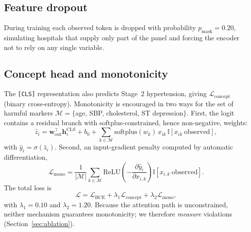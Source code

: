 \documentclass[journal]{IEEEtran}
\begin{document}
\subsection{Feature dropout}
During training each observed token is dropped with probability $p_{\mathrm{mask}}=0.20$, simulating hospitals that supply only part of the panel and forcing the encoder not to rely on any single variable.

\subsection{Concept head and monotonicity}
The \texttt{[CLS]} representation also predicts Stage~2 hypertension, giving $\mathcal{L}_{\mathrm{concept}}$ (binary cross-entropy). Monotonicity is encouraged in two ways for the set of harmful markers $\mathcal{M}=\{$age, SBP, cholesterol, ST depression$\}$. First, the logit contains a residual branch with softplus-constrained, hence non-negative, weights:
\begin{equation}
\hat z_i=\mathbf{w}_{\mathrm{out}}^{\top}\mathbf{h}^{\mathrm{CLS}}_i+b_0+\sum_{k\in\mathcal{M}}\mathrm{softplus}(w_k)\,x_{ik}\,\mathbb{I}[x_{ik}\ \text{observed}],
\end{equation}
with $\hat y_i=\sigma(\hat z_i)$. Second, an input-gradient penalty computed by automatic differentiation,
\begin{equation}
\mathcal{L}_{\mathrm{mono}}=\frac{1}{|\mathcal{M}|}\sum_{k\in\mathcal{M}}\mathrm{ReLU}\!\left(-\frac{\partial \hat y_i}{\partial x_{i,k}}\right)\mathbb{I}[x_{i,k}\ \text{observed}].
\end{equation}
The total loss is
\begin{equation}
\mathcal{L}=\mathcal{L}_{\mathrm{BCE}}+\lambda_1\mathcal{L}_{\mathrm{concept}}+\lambda_2\mathcal{L}_{\mathrm{mono}},
\end{equation}
with $\lambda_1=0.10$ and $\lambda_2=1.20$. Because the attention path is unconstrained, neither mechanism guarantees monotonicity; we therefore \emph{measure} violations (Section~\ref{sec:ablation}).
\end{document}
